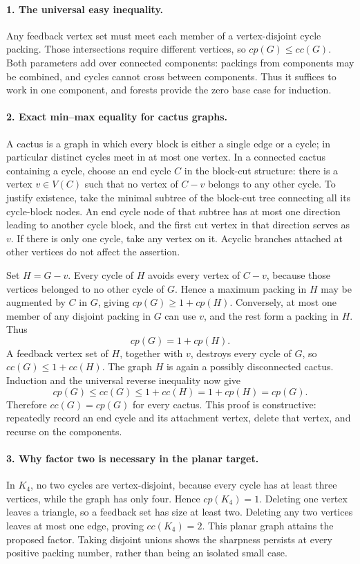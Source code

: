 \documentclass[11pt,a4paper]{article}
\begin{document}
\paragraph{1. The universal easy inequality.}
Any feedback vertex set must meet each member of a vertex-disjoint
cycle packing. Those intersections require different vertices, so
$cp(G)\le cc(G)$. Both parameters add over connected components:
packings from components may be combined, and cycles cannot cross
between components. Thus it suffices to work in one component, and
forests provide the zero base case for induction.

\paragraph{2. Exact min--max equality for cactus graphs.}
A cactus is a graph in which every block is either a single edge
or a cycle; in particular distinct cycles meet in at most one vertex.
In a connected cactus containing a cycle, choose an end cycle $C$
in the block-cut structure: there is a vertex $v\in V(C)$ such
that no vertex of $C-v$ belongs to any other cycle. To justify
existence, take the minimal subtree of the block-cut tree connecting
all its cycle-block nodes. An end cycle node of that subtree has
at most one direction leading to another cycle block, and the first
cut vertex in that direction serves as $v$. If there is only one
cycle, take any vertex on it. Acyclic branches attached at other
vertices do not affect the assertion.

Set $H=G-v$. Every cycle of $H$ avoids every vertex of $C-v$,
because those vertices belonged to no other cycle of $G$. Hence a
maximum packing in $H$ may be augmented by $C$ in $G$, giving
$cp(G)\ge1+cp(H)$. Conversely, at most one member of any disjoint
packing in $G$ can use $v$, and the rest form a packing in $H$.
Thus
\[
 cp(G)=1+cp(H).
\]
A feedback vertex set of $H$, together with $v$, destroys every
cycle of $G$, so $cc(G)\le1+cc(H)$. The graph $H$ is again a
possibly disconnected cactus. Induction and the universal reverse
inequality now give
\[
 cp(G)\le cc(G)\le1+cc(H)=1+cp(H)=cp(G).
\]
Therefore $cc(G)=cp(G)$ for every cactus. This proof is constructive:
repeatedly record an end cycle and its attachment vertex, delete that
vertex, and recurse on the components.

\paragraph{3. Why factor two is necessary in the planar target.}
In $K_4$, no two cycles are vertex-disjoint, because every cycle has
at least three vertices, while the graph has only four. Hence
$cp(K_4)=1$. Deleting one vertex leaves a triangle, so a feedback
set has size at least two. Deleting any two vertices leaves at most
one edge, proving $cc(K_4)=2$. This planar graph attains the proposed
factor. Taking disjoint unions shows the sharpness persists at every
positive packing number, rather than being an isolated small case.
\end{document}
